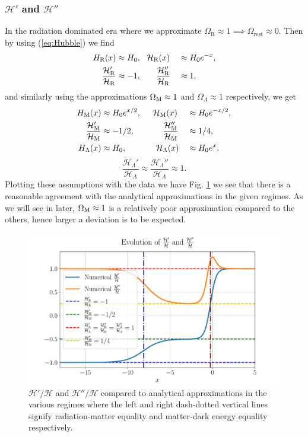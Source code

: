 \documentclass[%
reprint,
 amsmath,amssymb,
 aps,
]{revtex4-2}
\newcommand{\Hp}{\mathcal{H}}
\begin{document}
\subsubsection{$\Hp'$ and $\Hp''$}
In the radiation dominated era where we approximate $\Omega_{\text{R}}\approx1\implies\Omega_\text{rest}\approx0$. Then by using (\ref{eq:Hubble}) we find
\begin{alignat*}{2}
	H_{\text{R}}(x)&\approx H_0,~~\Hp_{\text{R}}(x)&&\approx H_0e^{-x},\\
	\frac{\Hp_{\text{R}}'}{\Hp_{\text{R}}}&\approx-1,\hspace{6.5mm}\frac{\Hp_{\text{R}}''}{\Hp_{\text{R}}}&&\approx1,
\end{alignat*}
and similarly using the approximations $\Omega_{\text M}\approx1$ and $\Omega_\Lambda\approx1$ respectively, we get
\begin{alignat*}{2}
	H_\text{M}(x)&\approx H_0e^{x/2},\hspace{5mm}\Hp_\text M(x)&&\approx H_0e^{-x/2},\\
	\frac{\Hp_\text M'}{\Hp_\text M}&\approx-1/2,\hspace{12mm}\frac{\Hp_\text M''}{\Hp_\text M}&&\approx1/4,\\
	H_\Lambda(x)&\approx H_0,\hspace{12.5mm}\Hp_\Lambda(x)&&\approx H_0e^{x},
\end{alignat*}
\vspace{-7.2mm}
\[\frac{\Hp_\Lambda'}{\Hp_\Lambda}\approx\frac{\Hp_\Lambda''}{\Hp_\Lambda}\approx1.\]
Plotting these assumptions with the data we have Fig. \ref{fig:dHpddHp_vs_anal} we see that there is a reasonable agreement with the analytical approximations in the given regimes. As we will see in later, $\Omega_{\text M}\approx1$ is a relatively poor approximation compared to the others, hence larger a deviation is to be expected.
\begin{figure}[ht!]
	\includegraphics[width = \linewidth]{Figures/dHpddHp_vs_anal.pdf}
	\caption{$\Hp'/\Hp$ and $\Hp''/\Hp$ compared to analytical approximations in the various regimes where the left and right dash-dotted vertical lines signify radiation-matter equality and matter-dark energy equality respectively.}
	\label{fig:dHpddHp_vs_anal}
\end{figure}
\end{document}
